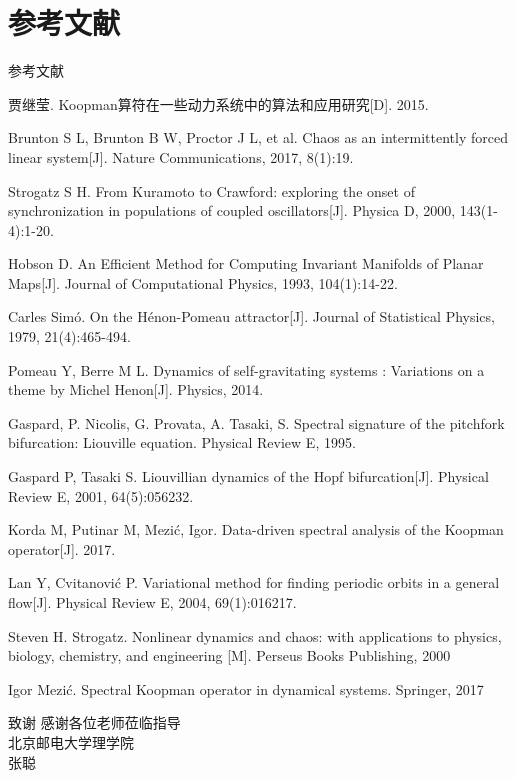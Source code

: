 \documentclass{beamer}
\begin{document}
\section{参考文献}
\begin{frame}{参考文献}
\begin{itemize}
{\scriptsize
\item 贾继莹. Koopman算符在一些动力系统中的算法和应用研究[D]. 2015.
\item Brunton S L, Brunton B W, Proctor J L, et al. Chaos as an intermittently forced linear system[J]. Nature Communications, 2017, 8(1):19.
\item Strogatz S H. From Kuramoto to Crawford: exploring the onset of synchronization in populations of coupled oscillators[J]. Physica D, 2000, 143(1-4):1-20.
\item Hobson D. An Efficient Method for Computing Invariant Manifolds of Planar Maps[J]. Journal of Computational Physics, 1993, 104(1):14-22.
\item Carles Simó. On the Hénon-Pomeau attractor[J]. Journal of Statistical Physics, 1979, 21(4):465-494.
\item Pomeau Y, Berre M L. Dynamics of self-gravitating systems : Variations on a theme by Michel Henon[J]. Physics, 2014.
\item Gaspard, P. Nicolis, G. Provata, A. Tasaki, S. Spectral signature of the pitchfork bifurcation: Liouville equation. Physical Review E, 1995.
\item Gaspard P, Tasaki S. Liouvillian dynamics of the Hopf bifurcation[J]. Physical Review E, 2001, 64(5):056232.
\item Korda M, Putinar M, Mezić, Igor. Data-driven spectral analysis of the Koopman operator[J]. 2017.
\item Lan Y, Cvitanović P. Variational method for finding periodic orbits in a general flow[J]. Physical Review E, 2004, 69(1):016217.
\item Steven H. Strogatz. Nonlinear dynamics and chaos: with applications to physics, biology, chemistry, and engineering [M]. Perseus Books Publishing, 2000
\item Igor Mezić. Spectral Koopman operator in dynamical systems. Springer, 2017
}
\end{itemize}
\end{frame}
\begin{frame}{致谢}
\centering
\huge 感谢各位老师莅临指导\\[30pt]
\normalsize 北京邮电大学理学院\\
张聪
\end{frame}
\end{document}
